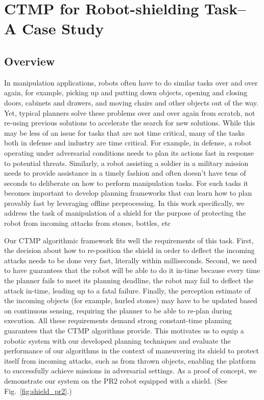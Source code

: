 \documentclass[a4paper]{report}
\begin{document}
\chapter{CTMP for Robot-shielding Task-- A Case Study}
\section{Overview}
In manipulation applications, robots often have to do similar tasks over and over again, for example, picking up and putting down objects, opening and closing doors, cabinets and drawers, and moving chairs and other objects out of the way. Yet, typical planners solve these problems over and over again from scratch, not re-using previous solutions to accelerate the search for new solutions. While this may be less of an issue for tasks that are not time critical, many of the tasks both in defense and industry are time critical. For example, in defense, a robot operating under adversarial conditions needs to plan its actions fast in response to potential threats. Similarly, a robot assisting a soldier in a military mission needs to provide assistance in a timely fashion and often doesn’t have tens of seconds to deliberate on how to perform manipulation tasks. For such tasks it becomes important to develop planning frameworks that can learn how to plan provably fast by leveraging offline preprocessing. In this work specifically, we address the task of manipulation of a shield for the purpose of protecting the robot from incoming attacks from stones, bottles, etc

Our CTMP algorithmic framework fits well the requirements of this task. First, the decision about how to re-position the shield in order to deflect the incoming attacks needs to be done very fast, literally within milliseconds. Second, we need to have guarantees that the robot will be able to do it in-time because every time the planner fails to meet its planning deadline, the robot may fail to deflect the attack in-time, leading up to a fatal failure. Finally, the perception estimate of the incoming objects (for example, hurled stones) may have to be updated based on continuous sensing, requiring the planner to be able to re-plan during execution. All these requirements demand strong constant-time planning guarantees that the CTMP algorithms provide. This motivates us to equip a robotic system with our developed planning techniques and evaluate the performance of our algorithms in the context of maneuvering its shield to protect itself from incoming attacks, such as from thrown objects, enabling the platform to successfully achieve missions in adversarial settings.
As a proof of concept, we demonstrate our system on the PR2 robot equipped with a shield. (See Fig.~\ref{fig:shield_pr2}.)
\end{document}

